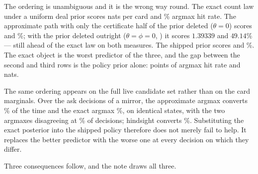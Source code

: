 \begin{table}[ht]
\centering
\caption{Each posterior scored as a predictor on identical states: mean
predictive negative log likelihood over the unresolved cards, the probability
each posterior assigns to its own argmax ask, and the realised hit rate of that
ask. Rows are the exact count law under the uniform deal prior, the approximate
path with the policy prior deleted, and the approximate path at the shipped
prior, followed by the $\theta$ sweep. Lower NLL and higher hit rate are better.
The unit is one card for the NLL column and one decision for the hit column.}
\label{tab:belief}
\small
%

\end{table}

The ordering is unambiguous and it is the wrong way round. The exact count law
under a uniform deal prior scores \vsixBeliefExactNLL{} nats per card and
\vsixBeliefExactHit{}\% argmax hit rate. The approximate path with only the
certificate half of the prior deleted ($\theta = 0$) scores \vsixBeliefNoPriorNLL{} and
\vsixBeliefNoPriorHit{}\%; with the prior deleted outright ($\theta = \phi = 0$,
) it scores $1.39339$ and $49.14\%$ --- still
ahead of the exact law on both measures. The shipped prior scores \vsixBeliefShippedNLL{} and
\vsixBeliefShippedHit{}\%. The exact object is the worst predictor of the three,
and the gap between the second and third rows is the policy prior alone:
\numThetaPriorHitGain{} points of argmax hit rate and \numThetaPriorNatGain{}
nats.

The same ordering appears on the full live candidate set rather than on the card
marginals. Over the ask decisions of a \vfive{} mirror, the approximate argmax
converts \vsixFullFastFive{}\% of the time and the exact argmax
\vsixFullExactFive{}\%, on identical states, with the two argmaxes disagreeing at
\vsixDisagreeFive{}\% of decisions; hindsight converts
\vsixFullBestFive{}\%. Substituting the exact posterior into the shipped policy
therefore does not merely fail to help. It replaces the better predictor with the
worse one at every decision on which they differ.

Three consequences follow, and the note draws all three.

